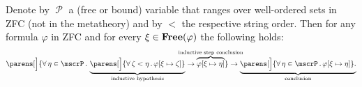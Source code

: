 \begin{theorem}\label{thm:well_ordered_induction}
  Denote by \( \mscrP \) a (free or bound) variable that ranges over well-ordered sets in ZFC (not in the metatheory) and by \( < \) the respective string order. Then for any formula \( \varphi \) in ZFC and for every \( \xi \in \operatorname{\mathbf{Free}}(\varphi) \) the following holds:
  \begin{equation}\label{eq:def:well_ordered_induction}
    \parens[\Big]
      {
        \qforall {\eta \in \mscrP}
          \underbrace
            {
              \parens[\Big] { \qforall {\zeta < \eta} \varphi[\xi \mapsto \zeta] }
            }_{\T{inductive hypothesis}}
        \rightarrow
        \overbrace{ \varphi[\xi \mapsto \eta] }^{\mathclap{\T{inductive step conclusion}}}
      }
    \rightarrow
    \underbrace
      {
        \parens[\Big]{ \qforall {\eta \in \mscrP} \varphi[\xi \mapsto \eta] }.
      }_{\T{conclusion}}
  \end{equation}
\end{theorem}
